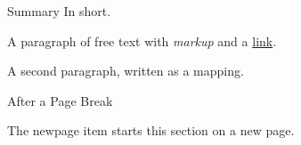 \documentclass{resume}
\begin{document}
    \begin{rSection}{ Summary }In short.\par
    
    A paragraph of free text with \textit{markup} and a \href{https://example.com}{link}.\par
    
    A second paragraph, written as a mapping.\par
    
    \end{rSection}
\newpage
    \begin{rSection}{ After a Page Break }
    
    The newpage item starts this section on a new page.\par
    
    \end{rSection}
\end{document}
